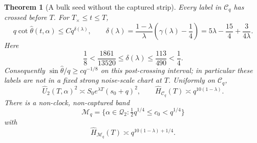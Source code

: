 \documentclass[11pt]{article}
\newtheorem{theorem}{Theorem}[section]
\theoremstyle{remark}\newtheorem{remark}[theorem]{Remark}
\newcommand{\Qtwo}{\mathcal Q_2}\newcommand{\Clk}{\mathcal C_q}
\begin{document}
\begin{theorem}[A bulk seed without the captured strip]\label{inc:AN03:bulkclock:v1:bulkseed}
Every label in $\Clk$ has crossed before $T$. For $T_\times\le t\le T$,
\begin{equation}\label{inc:AN03:bulkclock:v1:gap}
 q\cot\widehat\theta(t,\alpha)\le Cq^{\delta(\lambda)},\qquad
 \delta(\lambda)=\frac{1-\lambda}{\lambda}\left(\gamma(\lambda)-\frac14\right)
 =5\lambda-\frac{15}{4}+\frac{3}{4\lambda}.
\end{equation}
Here
\[
 \frac18<\frac{1861}{13520}\le\delta(\lambda)\le\frac{113}{490}<\frac14.
\]
Consequently $\sin\widehat\theta/q\ge c q^{-1/8}$ on this post-crossing interval; in particular these labels are not in a fixed strong noise-scale chart at $T$. Uniformly on $\Clk$,
\begin{equation}\label{inc:AN03:bulkclock:v1:pointseed}
 \widehat U_2(T,\alpha)^2\asymp S_0e^{\lambda T}(s_0+q)^2,
 \qquad \widehat H_{\Clk}(T)\asymp q^{10(1-\lambda)}.
\end{equation}
There is a non-clock, non-captured band
\[
 \mathcal M_q=\{\alpha\in\Qtwo:\tfrac12 q^{1/4}\le c_0<q^{1/4}\}
\]
with
\begin{equation}\label{inc:AN03:bulkclock:v1:middleband}
 \widehat H_{\mathcal M_q}(T)\asymp q^{10(1-\lambda)+1/4}.
\end{equation}
\end{theorem}
\end{document}

